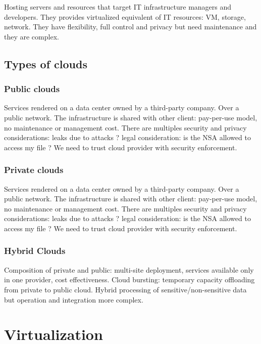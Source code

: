 Hosting servers and resources that target IT infrastructure managers and developers. They provides virtualized equivalent of IT resources: VM, storage, network. They have flexibility, full control and privacy but need maintenance and they are complex.

\section{Types of clouds}

\subsection{Public clouds}

Services rendered on a data center owned by a third-party company. Over a public network. The infrastructure is shared with other client: pay-per-use model, no maintenance or management cost. There are multiples security and privacy considerations: leaks due to attacks ? legal consideration: is the NSA allowed to access my file ? We need to trust cloud provider with security enforcement.

\subsection{Private clouds}

Services rendered on a data center owned by a third-party company. Over a public network. The infrastructure is shared with other client: pay-per-use model, no maintenance or management cost. There are multiples security and privacy considerations: leaks due to attacks ? legal consideration: is the NSA allowed to access my file ? We need to trust cloud provider with security enforcement.

\subsection{Hybrid Clouds}

Composition of private and public: multi-site deployment, services available only in one provider, cost effectiveness. Cloud bursting: temporary capacity offloading from private to public cloud. Hybrid processing of sensitive/non-sensitive data but operation and integration more complex.

\chapter{Virtualization}

